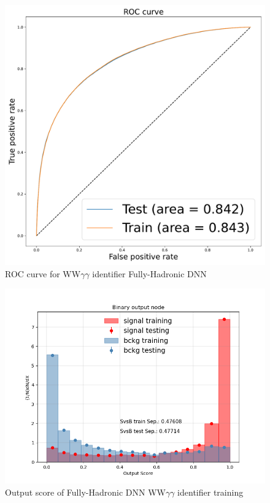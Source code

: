 \begin{figure}[!htbp]
    \centering
    \includegraphics[scale=0.4]{Sections/HHWWgg/images/FH_DNN/EFT/HHWWyyDNN_binary_scan_BalanceYields/ROC.pdf}%
    \caption{ROC curve for WW$\gamma \gamma$ identifier Fully-Hadronic DNN}
    \label{fig:FH_DNN_ROC_appendix}
\end{figure}

\begin{figure}[!htbp]
\centering
\includegraphics[scale=0.6]{Sections/HHWWgg/images/FH_DNN/EFT/HHWWyyDNN_binary_scan_BalanceYields/overfitting_plot_BinaryClassifier_Binary.png}%
\caption{Output score of Fully-Hadronic DNN WW$\gamma \gamma$ identifier training}
\label{fig:FH_DNN_OutputScore_appendix}
\end{figure}
